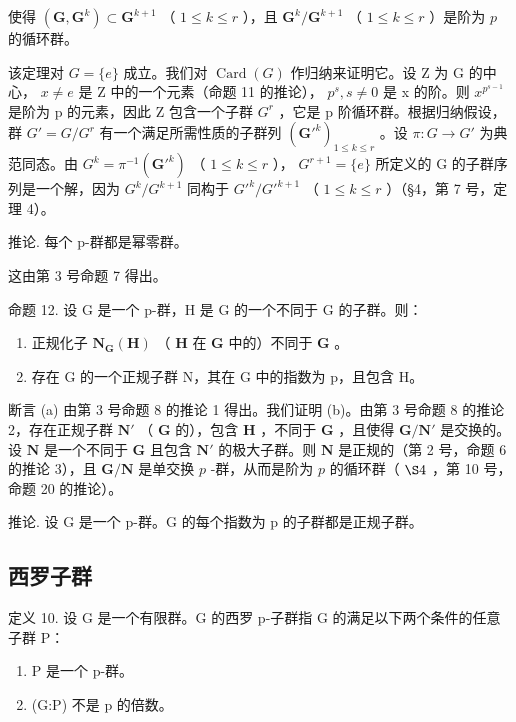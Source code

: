 使得 \((\mathbf{G},\mathbf{G}^k)\subset \mathbf{G}^{k + 1}\) （ \(1\leqslant k\leqslant r\) ），且 \(\mathbf{G}^k /\mathbf{G}^{k + 1}\) （ \(1\leqslant k\leqslant r\) ）是阶为 \(p\) 的循环群。

该定理对 \(G = \{e\}\) 成立。我们对 \(\operatorname{Card}(G)\) 作归纳来证明它。设 Z 为 G 的中心， \(x \neq e\) 是 Z 中的一个元素（命题 11 的推论）， \(p^{s}, s \neq 0\) 是 x 的阶。则 \(x^{p^{s-1}}\) 是阶为 p 的元素，因此 Z 包含一个子群 \(G^{r}\) ，它是 p 阶循环群。根据归纳假设，群 \(G' = G/G^{r}\) 有一个满足所需性质的子群列 \((\mathbf{G}'^{k})_{1 \leqslant k \leqslant r}\) 。设 \(\pi: G \to G'\) 为典范同态。由 \(G^{k} = \pi^{-1}(\mathbf{G}'^{k})\) （ \(1 \leqslant k \leqslant r\) ）， \(G^{r+1} = \{e\}\) 所定义的 G 的子群序列是一个解，因为 \(G^{k}/G^{k+1}\) 同构于 \(G'^{k}/G'^{k+1}\) （ \(1 \leqslant k \leqslant r\) ）（§4，第 7 号，定理 4）。

推论. 每个 p-群都是幂零群。

这由第 3 号命题 7 得出。

命题 12. 设 G 是一个 p-群，H 是 G 的一个不同于 G 的子群。则：

\begin{enumerate}
\def\labelenumi{(\alph{enumi})}
\item
  正规化子 \(\mathbf{N}_{\mathbf{G}}(\mathbf{H})\) （ \(\mathbf{H}\) 在 \(\mathbf{G}\) 中的）不同于 \(\mathbf{G}\) 。
\item
  存在 G 的一个正规子群 N，其在 G 中的指数为 p，且包含 H。
\end{enumerate}

断言 (a) 由第 3 号命题 8 的推论 1 得出。我们证明 (b)。由第 3 号命题 8 的推论 2，存在正规子群 \(\mathbf{N}'\) （ \(\mathbf{G}\) 的），包含 \(\mathbf{H}\) ，不同于 \(\mathbf{G}\) ，且使得 \(\mathbf{G} / \mathbf{N}'\) 是交换的。设 \(\mathbf{N}\) 是一个不同于 \(\mathbf{G}\) 且包含 \(\mathbf{N}'\) 的极大子群。则 \(\mathbf{N}\) 是正规的（第 2 号，命题 6 的推论 3），且 \(\mathbf{G} / \mathbf{N}\) 是单交换 \(p\) -群，从而是阶为 \(p\) 的循环群（ \(\S 4\) ，第 10 号，命题 20 的推论）。

推论. 设 G 是一个 p-群。G 的每个指数为 p 的子群都是正规子群。

\subsection{西罗子群}

定义 10. 设 G 是一个有限群。G 的西罗 p-子群指 G 的满足以下两个条件的任意子群 P：

\begin{enumerate}
\def\labelenumi{(\alph{enumi})}
\item
  P 是一个 p-群。
\item
  (G:P) 不是 p 的倍数。
\end{enumerate}

